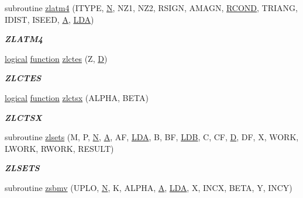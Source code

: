 \begin{DoxyCompactItemize}
subroutine \hyperlink{group__complex16__eig_ga4f20b187dff04372757a4008eecbc21f}{zlatm4} (I\+T\+Y\+P\+E, \hyperlink{polmisc_8c_a0240ac851181b84ac374872dc5434ee4}{N}, N\+Z1, N\+Z2, R\+S\+I\+G\+N, A\+M\+A\+G\+N, \hyperlink{superlu__enum__consts_8h_af00a42ecad444bbda75cde1b64bd7e72a9b5c151728d8512307565994c89919d5}{R\+C\+O\+N\+D}, T\+R\+I\+A\+N\+G, I\+D\+I\+S\+T, I\+S\+E\+E\+D, \hyperlink{classA}{A}, \hyperlink{example__user_8c_ae946da542ce0db94dced19b2ecefd1aa}{L\+D\+A})
\begin{DoxyCompactList}\small\item\em {\bfseries Z\+L\+A\+T\+M4} \end{DoxyCompactList}\item 
\hyperlink{tnc_8c_aa7b64cdf39500931f7b333343791a104}{logical} \hyperlink{afunc_8m_a7b5e596df91eadea6c537c0825e894a7}{function} \hyperlink{group__complex16__eig_ga070d0aa3531da9c4cf1187ddacfadc04}{zlctes} (Z, \hyperlink{odrpack_8h_a7dae6ea403d00f3687f24a874e67d139}{D})
\begin{DoxyCompactList}\small\item\em {\bfseries Z\+L\+C\+T\+E\+S} \end{DoxyCompactList}\item 
\hyperlink{tnc_8c_aa7b64cdf39500931f7b333343791a104}{logical} \hyperlink{afunc_8m_a7b5e596df91eadea6c537c0825e894a7}{function} \hyperlink{group__complex16__eig_gafb3b6ea91b75f8ed29914e8e7169adb3}{zlctsx} (A\+L\+P\+H\+A, B\+E\+T\+A)
\begin{DoxyCompactList}\small\item\em {\bfseries Z\+L\+C\+T\+S\+X} \end{DoxyCompactList}\item 
subroutine \hyperlink{group__complex16__eig_ga67fc2605422315893d6fec201c155a59}{zlsets} (M, P, \hyperlink{polmisc_8c_a0240ac851181b84ac374872dc5434ee4}{N}, \hyperlink{classA}{A}, A\+F, \hyperlink{example__user_8c_ae946da542ce0db94dced19b2ecefd1aa}{L\+D\+A}, B, B\+F, \hyperlink{example__user_8c_a50e90a7104df172b5a89a06c47fcca04}{L\+D\+B}, C, C\+F, \hyperlink{odrpack_8h_a7dae6ea403d00f3687f24a874e67d139}{D}, D\+F, X, W\+O\+R\+K, L\+W\+O\+R\+K, R\+W\+O\+R\+K, R\+E\+S\+U\+L\+T)
\begin{DoxyCompactList}\small\item\em {\bfseries Z\+L\+S\+E\+T\+S} \end{DoxyCompactList}\item 
subroutine \hyperlink{group__complex16__eig_ga63eabd833fa379aa63dafb0a57392fe4}{zsbmv} (U\+P\+L\+O, \hyperlink{polmisc_8c_a0240ac851181b84ac374872dc5434ee4}{N}, K, A\+L\+P\+H\+A, \hyperlink{classA}{A}, \hyperlink{example__user_8c_ae946da542ce0db94dced19b2ecefd1aa}{L\+D\+A}, X, I\+N\+C\+X, B\+E\+T\+A, Y, I\+N\+C\+Y)

\end{DoxyCompactItemize}
